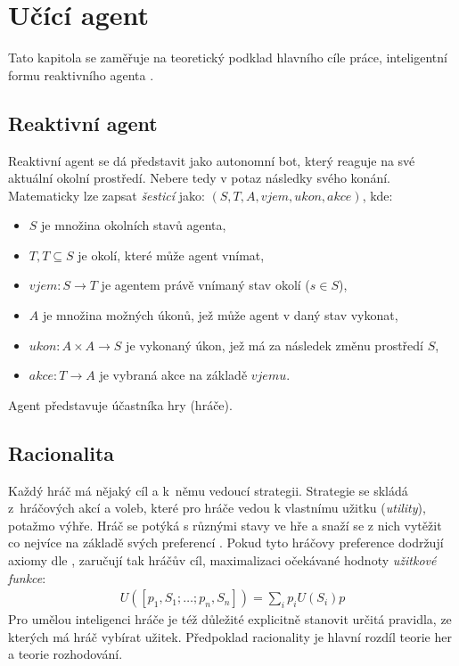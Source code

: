 \chapter{Učící agent}
Tato kapitola se zaměřuje na teoretický podklad hlavního cíle práce, inteligentní formu reaktivního agenta \cite{AI3}.
\section{Reaktivní agent}
Reaktivní agent \cite{AI3} se dá představit jako autonomní bot, který reaguje na své aktuální okolní prostředí. Nebere tedy v potaz následky svého konání. Matematicky lze zapsat \textit{šesticí} \cite{AI3} jako: $(S, T, A, vjem, ukon, akce)$, kde:
\begin{itemize}
\item $S$ je množina okolních stavů agenta,
\item $T, T\subseteq S$ je okolí, které může agent vnímat,
\item $vjem: S \to T$ je agentem právě vnímaný stav okolí ($s \in S$),
\item $A$ je množina možných úkonů, jež může agent v daný stav vykonat,
\item $ukon: A \times A \to S$ je vykonaný úkon, jež má za následek změnu prostředí $S$,
\item $akce: T \to A$ je vybraná akce na základě $vjemu$.
\end{itemize}
Agent představuje účastníka hry (hráče).

\section{Racionalita}
\label{sec:racionalita}
Každý hráč má nějaký cíl a k němu vedoucí strategii. Strategie se skládá z hráčových akcí a voleb, které pro hráče vedou k vlastnímu užitku (\textit{utility}), potažmo výhře. Hráč se potýká s různými stavy ve hře a snaží se z nich vytěžit co nejvíce na základě svých preferencí \cite{berkeley}. Pokud tyto hráčovy preference dodržují axiomy dle \cite{mas}, zaručují tak hráčův cíl, maximalizaci očekávané hodnoty \textit{užitkové funkce}:
\begin{align}
U([p_1,S_1;\dots;p_n,S_n]) = \sum_{i}p_iU(S_i)p
\end{align}
Pro umělou inteligenci hráče je též důležité explicitně stanovit určitá pravidla, ze kterých má hráč vybírat užitek. Předpoklad racionality je hlavní rozdíl teorie her a teorie rozhodování.

